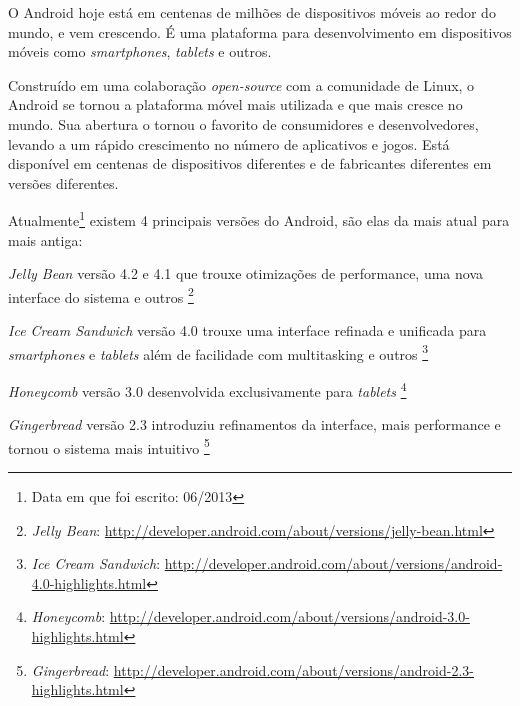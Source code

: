 \documentclass[a4paper,12pt,brazil,doubleside]{book}
\begin{document}
\clearpage %
\thispagestyle{empty}

\thispagestyle{empty}

\doublespace

\cleardoublepage

\pagestyle{body}

O Android hoje está em centenas de milhões de dispositivos móveis ao redor do mundo, e vem crescendo. É uma plataforma para desenvolvimento em dispositivos móveis como \emph{smartphones}, \emph{tablets} e outros. 

Construído em uma colaboração \emph{open-source} com a comunidade de Linux, o Android se tornou a plataforma móvel mais utilizada e que mais cresce no mundo. Sua abertura o tornou o favorito de consumidores e desenvolvedores, levando a um rápido crescimento no número de aplicativos e jogos. Está disponível em centenas de dispositivos diferentes e de fabricantes diferentes em versões diferentes.

Atualmente\footnote{Data em que foi escrito: 06/2013} existem 4 principais versões do Android, são elas da mais atual para mais antiga:
\bi
\item \emph{Jelly Bean} versão 4.2 e 4.1 que trouxe otimizações de performance, uma nova interface do sistema e outros
\footnote{\emph{Jelly Bean}: \href{http://developer.android.com/about/versions/jelly-bean.html}{http://developer.android.com/about/versions/jelly-bean.html}}
\item \emph{Ice Cream Sandwich} versão 4.0 trouxe uma interface refinada e unificada para \emph{smartphones} e \emph{tablets} além de facilidade com multitasking e outros
\footnote{\emph{Ice Cream Sandwich}: \href{http://developer.android.com/about/versions/android-4.0-highlights.html}{http://developer.android.com/about/versions/android-4.0-highlights.html}}
\item \emph{Honeycomb} versão 3.0 desenvolvida exclusivamente para \emph{tablets}
\footnote{\emph{Honeycomb}: \href{http://developer.android.com/about/versions/android-3.0-highlights.html}{http://developer.android.com/about/versions/android-3.0-highlights.html}}
\item \emph{Gingerbread} versão 2.3 introduziu refinamentos da interface, mais performance e tornou o sistema mais intuitivo
\footnote{\emph{Gingerbread}: \href{http://developer.android.com/about/versions/android-2.3-highlights.html}{http://developer.android.com/about/versions/android-2.3-highlights.html}}
\ei
\end{document}
